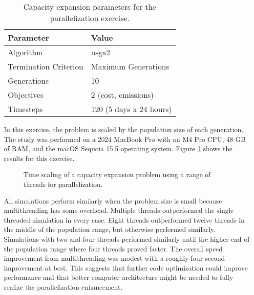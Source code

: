 \begin{table}[htbp!]
    \centering
    \caption{Capacity expansion parameters for the parallelization exercise.}
    \label{tab:thread-scaling-params}
    \begin{tabular}{ll}
        \toprule
        Parameter & Value \\
        \midrule
        Algorithm & \acs{nsga2}\\
        Termination Criterion & Maximum Generations\\
        Generations & 10 \\
        Objectives & 2 (cost, emissions)\\
        Timesteps & 120 (5 days x 24 hours)\\
        \bottomrule
    \end{tabular}
\end{table}

\noindent In this exercise, the problem is scaled by the population size of each
generation. The study was performed on a 2024 MacBook Pro with an M4 Pro CPU, 
48 GB of RAM, and the macOS Sequoia 15.5 operating system. Figure
\ref{fig:thread-scaling} shows the results for this exercise.

\begin{figure}[htbp!]
    \centering
    \resizebox{0.75\columnwidth}{!}{}
    \caption{Time scaling of a capacity expansion problem using a range of
    threads for parallelization.}
    \label{fig:thread-scaling}
\end{figure}

All simulations perform similarly when the problem size is small
because multithreading has some overhead. Multiple threads outperformed the
single threaded simulation in every case. Eight threads outperformed twelve
threads in the middle of the population range, but otherwise performed
similarly. Simulations with two and four threads performed similarly until the
higher end of the population range where four threads proved faster. The overall
speed improvement from multithreading was modest with a roughly four second
improvement at best. This suggests that further code optimization could improve
performance and that better computer architecture might be needed to fully
realize the parallelization enhancement.

\FloatBarrier